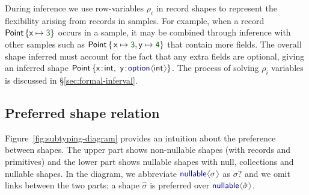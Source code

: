 \documentclass[10pt,preprint,clearpagebib]{sigplanconf}
\newcommand{\langl}{\begin{picture}(4.5,7)
\put(1.1,2.5){\rotatebox{60}{\line(1,0){5.5}}}
\put(1.1,2.5){\rotatebox{300}{\line(1,0){5.5}}}
\end{picture}}
\newcommand{\rangl}{\begin{picture}(4.5,7)
\put(.9,2.5){\rotatebox{120}{\line(1,0){5.5}}}
\put(.9,2.5){\rotatebox{240}{\line(1,0){5.5}}}
\end{picture}}
\newcommand{\kvd}[1]{\textnormal{\textcolor{kvdclr}{\sffamily #1}}}
\newcommand{\num}[1]{\textnormal{\textcolor{numclr}{\sffamily #1}}}
\newcommand{\ident}[1]{\textnormal{\sffamily #1}}
\begin{document}
During inference we use row-variables $\rho_i$ \cite{rows-cardelli} in record shapes to represent the flexibility
arising from records in samples. For example, when a 
record $\ident{Point}\,\{ \ident{x} \mapsto \num{3} \}$ occurs in a sample,
it may be combined through inference with other
samples such as $\ident{Point}\,\{\, \ident{x}\mapsto\num{3}, \ident{y}\mapsto\num{4} \}$ that contain more fields. The
overall shape inferred must account for the fact that any extra fields are optional,
giving an inferred shape $\ident{Point}\,\{ \ident{x}\!:\!\ident{int},~ \ident{y}\!:\!\kvd{option}\langl\ident{int}\rangl\}$.
The process of solving $\rho_i$ variables is discussed in \S\ref{sec:formal-inferval}. 



\subsection{Preferred shape relation}
\label{sec:inference-subtyping}

Figure~\ref{fig:subtyping-diagram} provides an intuition about the preference between 
shapes. The upper part shows non-nullable shapes (with records and primitives) and the lower part 
shows nullable shapes with \kvd{null}, collections and nullable shapes. In the diagram, we 
abbreviate $\kvd{nullable}\langl\sigma\rangl$ as $\sigma?$ and we omit links between the two parts;
a shape $\hat{\sigma}$ is preferred over $\kvd{nullable}\langl\hat{\sigma}\rangl$.
\end{document}
